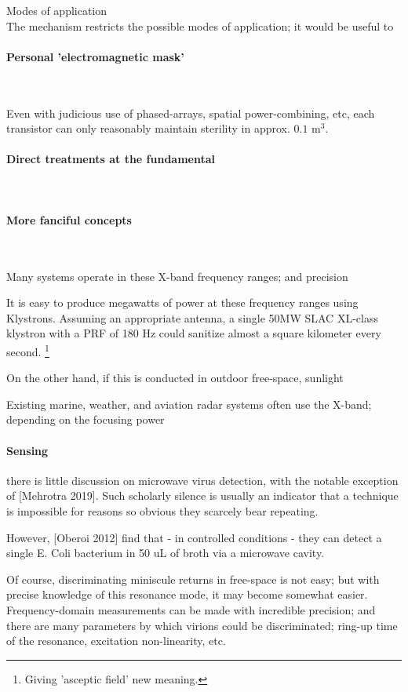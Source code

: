 \documentclass[fleqn,10pt]{article}
\begin{document}
\clearpage
\begin{multicols}{1}
{\Large Modes of application}\\

The mechanism restricts the possible modes of application; it would be useful to 

\paragraph{\textbf{Personal 'electromagnetic mask'}}\

Even with judicious use of phased-arrays, spatial power-combining, etc, each transistor can only reasonably maintain sterility in approx. $ 0.1 \text{ m}^3 $.

\paragraph{\textbf{Direct treatments at the fundamental}}\




\paragraph{\textbf{More fanciful concepts}}\

Many systems operate in these X-band frequency ranges; and precision 

It is easy to produce megawatts of power at these frequency ranges using Klystrons. Assuming an appropriate antenna, a single 50MW SLAC XL-class klystron with a PRF of 180 Hz could sanitize almost a square kilometer every second. \footnote{Giving 'asceptic field' new meaning.}

On the other hand, if this is conducted in outdoor free-space, sunlight

Existing marine, weather, and aviation radar systems often use the X-band; depending on the focusing power

\paragraph{Sensing}

there is little discussion on microwave virus detection, with the notable exception of [Mehrotra 2019]. Such scholarly silence is usually an indicator that a technique is impossible for reasons so obvious they scarcely bear repeating. 

However, [Oberoi 2012] find that - in controlled conditions - they can detect a single E. Coli bacterium in 50 uL of broth via a microwave cavity. 

Of course, discriminating miniscule returns in free-space is not easy; but with precise knowledge of this resonance mode, it may become somewhat easier. Frequency-domain measurements can be made with incredible precision; and there are many parameters by which virions could be discriminated; ring-up time of the resonance, excitation non-linearity, etc.


\end{multicols}
\end{document}
